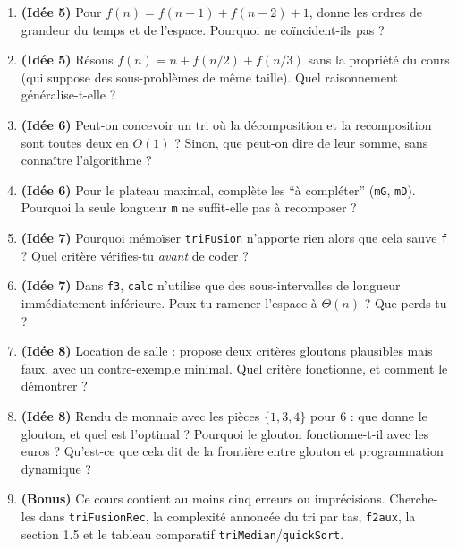 \documentclass{article}
\begin{document}
\begin{enumerate}
  \item \textbf{(Idée 5)} Pour $f(n) = f(n-1) + f(n-2) + 1$, donne les ordres de grandeur du temps et de l'espace. Pourquoi ne coïncident-ils pas ?

  \item \textbf{(Idée 5)} Résous $f(n) = n + f(n/2) + f(n/3)$ sans la propriété du cours (qui suppose des sous-problèmes de même taille). Quel raisonnement généralise-t-elle ?

  \item \textbf{(Idée 6)} Peut-on concevoir un tri où la décomposition et la recomposition sont toutes deux en $O(1)$ ? Sinon, que peut-on dire de leur somme, sans connaître l'algorithme ?

  \item \textbf{(Idée 6)} Pour le plateau maximal, complète les ``à compléter'' (\texttt{mG}, \texttt{mD}). Pourquoi la seule longueur \texttt{m} ne suffit-elle pas à recomposer ?

  \item \textbf{(Idée 7)} Pourquoi mémoïser \texttt{triFusion} n'apporte rien alors que cela sauve \texttt{f} ? Quel critère vérifies-tu \emph{avant} de coder ?

  \item \textbf{(Idée 7)} Dans \texttt{f3}, \texttt{calc} n'utilise que des sous-intervalles de longueur immédiatement inférieure. Peux-tu ramener l'espace à $\Theta(n)$ ? Que perds-tu ?

  \item \textbf{(Idée 8)} Location de salle : propose deux critères gloutons plausibles mais faux, avec un contre-exemple minimal. Quel critère fonctionne, et comment le démontrer ?

  \item \textbf{(Idée 8)} Rendu de monnaie avec les pièces $\{1, 3, 4\}$ pour $6$ : que donne le glouton, et quel est l'optimal ? Pourquoi le glouton fonctionne-t-il avec les euros ? Qu'est-ce que cela dit de la frontière entre glouton et programmation dynamique ?

  \item \textbf{(Bonus)} Ce cours contient au moins cinq erreurs ou imprécisions. Cherche-les dans \texttt{triFusionRec}, la complexité annoncée du tri par tas, \texttt{f2aux}, la section 1.5 et le tableau comparatif \texttt{triMedian}/\texttt{quickSort}.

\end{enumerate}
\end{document}
